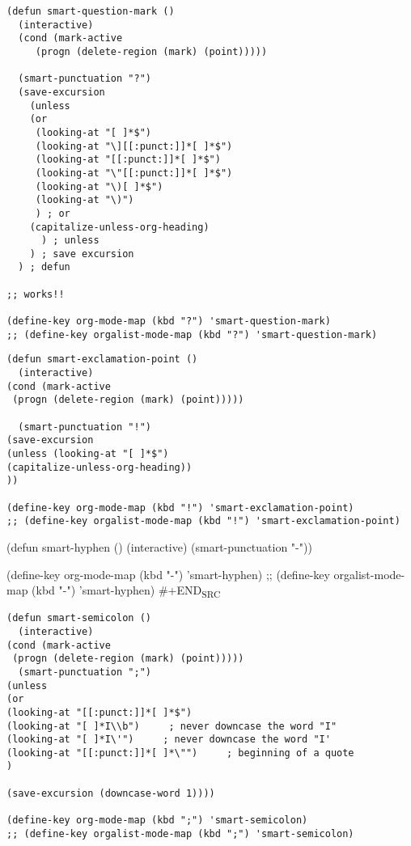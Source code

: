 \documentclass[11pt]{article}
\begin{document}
\label{sec:org82f527d}
\begin{verbatim}
(defun smart-question-mark ()
  (interactive)
  (cond (mark-active
	 (progn (delete-region (mark) (point))))) 

  (smart-punctuation "?")
  (save-excursion
    (unless
	(or
	 (looking-at "[ ]*$")
	 (looking-at "\][[:punct:]]*[ ]*$")
	 (looking-at "[[:punct:]]*[ ]*$")
	 (looking-at "\"[[:punct:]]*[ ]*$")
	 (looking-at "\)[ ]*$")
	 (looking-at "\)")
	 ) ; or
    (capitalize-unless-org-heading)
      ) ; unless
    ) ; save excursion
  ) ; defun

;; works!!

(define-key org-mode-map (kbd "?") 'smart-question-mark)
;; (define-key orgalist-mode-map (kbd "?") 'smart-question-mark)
\end{verbatim}

\label{sec:orgb3a0f5d}
\begin{verbatim}
(defun smart-exclamation-point ()
  (interactive)
(cond (mark-active
 (progn (delete-region (mark) (point))))) 

  (smart-punctuation "!")
(save-excursion
(unless (looking-at "[ ]*$")
(capitalize-unless-org-heading))
))

(define-key org-mode-map (kbd "!") 'smart-exclamation-point)
;; (define-key orgalist-mode-map (kbd "!") 'smart-exclamation-point)
\end{verbatim}

\label{sec:org9213062}
(defun smart-hyphen ()
  (interactive)
  (smart-punctuation "-"))

(define-key org-mode-map (kbd "-") 'smart-hyphen)
;; (define-key orgalist-mode-map (kbd "-") 'smart-hyphen)
\#+END\textsubscript{SRC}

\label{sec:org930fc2b}

\begin{verbatim}
(defun smart-semicolon ()
  (interactive)
(cond (mark-active
 (progn (delete-region (mark) (point))))) 
  (smart-punctuation ";")
(unless
(or
(looking-at "[[:punct:]]*[ ]*$")
(looking-at "[ ]*I\\b")     ; never downcase the word "I"
(looking-at "[ ]*I\'")     ; never downcase the word "I'
(looking-at "[[:punct:]]*[ ]*\"")     ; beginning of a quote
)

(save-excursion (downcase-word 1))))

(define-key org-mode-map (kbd ";") 'smart-semicolon)
;; (define-key orgalist-mode-map (kbd ";") 'smart-semicolon)
\end{verbatim}
\end{document}
